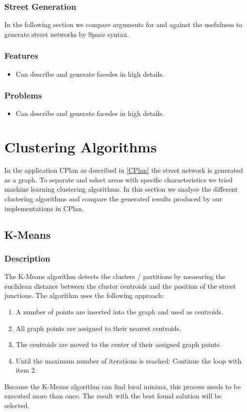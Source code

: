 \documentclass[11pt, a4paper]{report}
\begin{document}
\pagebreak
\subsubsection{Street Generation}
In the following section we compare arguments for and against the usefulness to generate street networks by Space syntax. 
\subsubsection{Features}
\begin{itemize}
    \item Can describe and generate facedes in high details.
\end{itemize}

\subsubsection{Problems}
\begin{itemize}
    \item Can describe and generate facedes in high details.
\end{itemize}

\pagebreak
\section{Clustering Algorithms}
In the application CPlan as described in \ref{CPlan} the street network is generated as a graph. To separate and select areas with specific characteristics we tried machine learning clustering algorithms. In this section we analyse the different clustering algorithms and compare the generated results produced by our implementations in CPlan.
\subsection{K-Means}
\subsubsection{Description}
The K-Means algorithm detects the clusters / partitions by measuring the euclidean distance between the cluster centroids and the position of the street junctions. The algorithm uses the following approach:

\begin{enumerate}
    \item A number of points are inserted into the graph and used as centroids.
    \item All graph points are assigned to their nearest centroids.
    \item The centroids are moved to the center of their assigned graph points.
    \item Until the maximum number of iterations is reached: Continue the loop with item 2.
\end{enumerate}
Because the K-Means algorithm can find local minima, this process needs to be executed more than once. The result with the best found solution will be selected.
\end{document}

